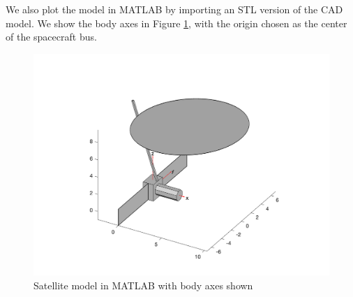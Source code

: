 We also plot the model in MATLAB by importing an STL version of the CAD model. We show the body axes in Figure \ref{fig:MATLAB_model}, with the origin chosen as the center of the spacecraft bus.

\begin{figure}[H]
\centering
\includegraphics[scale=0.75]{Images/ps1_model.png}
\caption{Satellite model in MATLAB with body axes shown}
\label{fig:MATLAB_model}
\end{figure}

